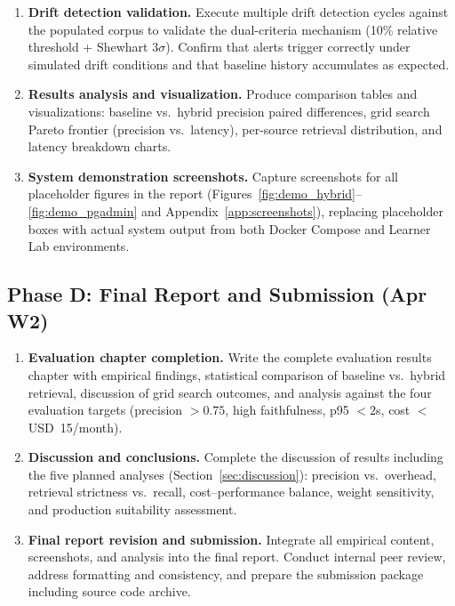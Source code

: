 \documentclass[12pt,a4paper]{report}
\begin{document}
\begin{enumerate}[leftmargin=0.5in, resume]
  \item \textbf{Drift detection validation.} Execute multiple drift detection cycles against the populated corpus to validate the dual-criteria mechanism (10\% relative threshold + Shewhart $3\sigma$). Confirm that alerts trigger correctly under simulated drift conditions and that baseline history accumulates as expected.

  \item \textbf{Results analysis and visualization.} Produce comparison tables and visualizations: baseline vs.\ hybrid precision paired differences, grid search Pareto frontier (precision vs.\ latency), per-source retrieval distribution, and latency breakdown charts.

  \item \textbf{System demonstration screenshots.} Capture screenshots for all placeholder figures in the report (Figures~\ref{fig:demo_hybrid}--\ref{fig:demo_pgadmin} and Appendix~\ref{app:screenshots}), replacing placeholder boxes with actual system output from both Docker Compose and Learner Lab environments.
\end{enumerate}

\subsection{Phase D: Final Report and Submission (Apr W2)}

\begin{enumerate}[leftmargin=0.5in, resume]
  \item \textbf{Evaluation chapter completion.} Write the complete evaluation results chapter with empirical findings, statistical comparison of baseline vs.\ hybrid retrieval, discussion of grid search outcomes, and analysis against the four evaluation targets (precision $> 0.75$, high faithfulness, p95 $< 2$s, cost $<$ USD~15/month).

  \item \textbf{Discussion and conclusions.} Complete the discussion of results including the five planned analyses (Section~\ref{sec:discussion}): precision vs.\ overhead, retrieval strictness vs.\ recall, cost--performance balance, weight sensitivity, and production suitability assessment.

  \item \textbf{Final report revision and submission.} Integrate all empirical content, screenshots, and analysis into the final report. Conduct internal peer review, address formatting and consistency, and prepare the submission package including source code archive.
\end{enumerate}
\end{document}
